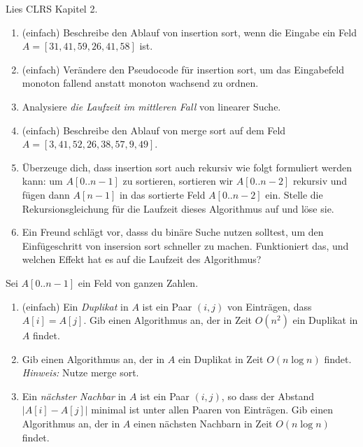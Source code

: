 \documentclass{uebung_cs}
\begin{document}
\begin{aufgabe}\label{lesen}
	Lies CLRS Kapitel 2.
\end{aufgabe}

\begin{aufgabe}\label{tue-first}\mbox{}
	\begin{enumerate}
		\item (einfach) Beschreibe den Ablauf von insertion sort, wenn die Eingabe ein Feld $A=[31,41,59,26,41,58]$ ist.
		\item (einfach) Verändere den Pseudocode für insertion sort, um das Eingabefeld monoton fallend anstatt monoton wachsend zu ordnen.	
		\item Analysiere \emph{die Laufzeit im mittleren Fall} von linearer Suche.
		\item (einfach) Beschreibe den Ablauf von merge sort auf dem Feld $A=[3,41,52,26,38,57,9,49]$.
		\item Überzeuge dich, dass insertion sort auch rekursiv wie folgt formuliert werden kann: um $A[0..n-1]$ zu sortieren, sortieren wir $A[0..n-2]$ rekursiv und fügen dann $A[n-1]$ in das sortierte Feld $A[0..n-2]$ ein. Stelle die Rekursionsgleichung für die Laufzeit dieses Algorithmus auf und löse sie.
		\item Ein Freund schlägt vor, dasss du binäre Suche nutzen solltest, um den Einfügeschritt von insersion sort schneller zu machen. Funktioniert das, und welchen Effekt hat es auf die Laufzeit des Algorithmus?
	\end{enumerate}
\end{aufgabe}

\begin{aufgabe}
	Sei $A[0..n-1]$ ein Feld von ganzen Zahlen.
	\begin{enumerate}
		\item (einfach) Ein \emph{Duplikat} in $A$ ist ein Paar $(i,j)$ von Einträgen, dass $A[i]=A[j]$. Gib einen Algorithmus an, der in Zeit $O(n^2)$ ein Duplikat in $A$ findet.
		\item Gib einen Algorithmus an, der in $A$ ein Duplikat in Zeit $O(n\log n)$ findet. \emph{Hinweis:} Nutze merge sort.
		\item Ein \emph{nächster Nachbar} in $A$ ist ein Paar $(i,j)$, so dass der Abstand $|A[i]-A[j]|$ minimal ist unter allen Paaren von Einträgen. Gib einen Algorithmus an, der in $A$ einen nächsten Nachbarn in Zeit $O(n\log n)$ findet.
	\end{enumerate}
\end{aufgabe}
\end{document}
